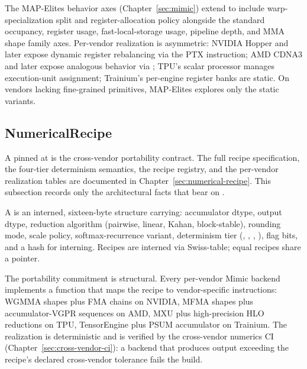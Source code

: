 The MAP-Elites behavior axes (Chapter~\ref{sec:mimic}) extend to include warp-specialization split and register-allocation policy alongside the standard occupancy, register usage, fast-local-storage usage, pipeline depth, and MMA shape family axes.
Per-vendor realization is asymmetric: NVIDIA Hopper and later expose dynamic register rebalancing via the  PTX instruction; AMD CDNA3 and later expose analogous behavior via ; TPU's scalar processor manages execution-unit assignment; Trainium's per-engine register banks are static.
On vendors lacking fine-grained primitives, MAP-Elites explores only the static  variants.

\subsection{NumericalRecipe}
\label{sec:ir002-recipe}

A  pinned at  is the cross-vendor portability contract.
The full recipe specification, the four-tier determinism semantics, the recipe registry, and the per-vendor realization tables are documented in Chapter~\ref{sec:numerical-recipe}.
This subsection records only the architectural facts that bear on .

\begin{definition}[NumericalRecipe]
\label{def:ir002-recipe}
A  is an interned, sixteen-byte structure carrying: accumulator dtype, output dtype, reduction algorithm (pairwise, linear, Kahan, block-stable), rounding mode, scale policy, softmax-recurrence variant, determinism tier (, , , ), flag bits, and a hash for interning.
Recipes are interned via Swiss-table; equal recipes share a pointer.
\end{definition}

The portability commitment is structural.
Every per-vendor Mimic backend implements a  function that maps the recipe to vendor-specific instructions: WGMMA shapes plus FMA chains on NVIDIA, MFMA shapes plus accumulator-VGPR sequences on AMD, MXU plus high-precision HLO reductions on TPU, TensorEngine plus PSUM accumulator on Trainium.
The realization is deterministic and is verified by the cross-vendor numerics CI (Chapter~\ref{sec:cross-vendor-ci}): a backend that produces output exceeding the recipe's declared cross-vendor tolerance fails the build.

